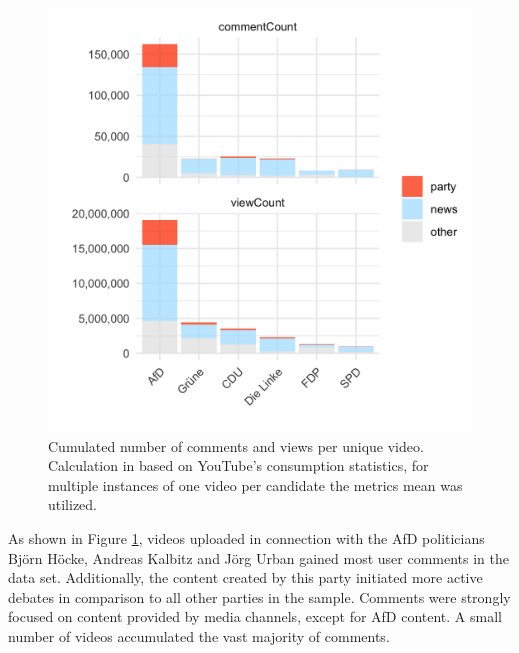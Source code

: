 \documentclass[sigchi, nonacm=true]{acmart}
\begin{document}
  \begin{figure}[]
    \centering
    \includegraphics[width=\linewidth]{plots/combined.png}

    \caption{Cumulated number of comments and views per unique video. Calculation in based on YouTube's consumption statistics, for multiple instances of one video per candidate the metrics mean was utilized.}
    \label{fig::comment_count}
  \end{figure}

  As shown in Figure \ref{fig::comment_count}, videos uploaded in connection with the AfD politicians Bj\"orn H\"ocke, Andreas Kalbitz and J\"org Urban gained most user comments in the data set. Additionally, the content created by this party initiated more active debates in comparison to all other parties in the sample. Comments were strongly focused on content provided by media channels, except for AfD content.
  A small number of videos accumulated the vast majority of comments.
\end{document}
